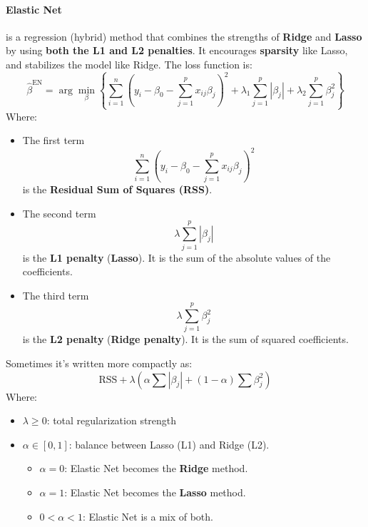\paragraph{Elastic Net}\label{paragraph: Elastic Net}

 is a regression (hybrid) method that combines the strengths of \textbf{Ridge} and \textbf{Lasso} by using \textbf{both the L1 and L2 penalties}. It encourages \textbf{sparsity} like Lasso, and stabilizes the model like Ridge. The loss function is:
\begin{equation}
    \hat{\beta}^{\text{EN}} = \arg\min_{\beta} \left\{
        \displaystyle\sum_{i=1}^{n} \left(y_i - \beta_0 - \sum_{j=1}^{p} x_{ij} \beta_j \right)^2
        + \lambda_1 \sum_{j=1}^p \left|\beta_j\right|
        + \lambda_2 \sum_{j=1}^p \beta_j^2
    \right\}
\end{equation}
Where:
\begin{itemize}
    \item The first term
    \begin{equation*}
        \displaystyle\sum_{i=1}^{n} \left(y_i - \beta_0 - \sum_{j=1}^{p} x_{ij} \beta_j \right)^2
    \end{equation*}
    is the \textbf{Residual Sum of Squares (RSS)}.
    \item The second term
    \begin{equation*}
        \lambda \sum_{j=1}^p |\beta_j|
    \end{equation*}
    is the \textbf{L1 penalty} (\textbf{Lasso}). It is the sum of the absolute values of the coefficients.
    \item The third term
    \begin{equation*}
        \lambda \sum_{j=1}^p \beta_j^2
    \end{equation*}
    is the \textbf{L2 penalty} (\textbf{Ridge penalty}). It is the sum of squared coefficients.
\end{itemize}
Sometimes it's written more compactly as:
\begin{equation}
    \text{RSS} + \lambda \left( \alpha \sum \left|\beta_j\right| + \left(1 - \alpha\right) \sum \beta_j^2 \right)
\end{equation}
Where:
\begin{itemize}
    \item $\lambda \geq 0$: total regularization strength
    \item $\alpha \in \left[0, 1\right]$: balance between Lasso (L1) and Ridge (L2).
    \begin{itemize}
        \item $\alpha = 0$: Elastic Net becomes the \textbf{Ridge} method.
        \item $\alpha = 1$: Elastic Net becomes the \textbf{Lasso} method.
        \item $ 0 < \alpha < 1$: Elastic Net is a mix of both.
    \end{itemize}
\end{itemize}

